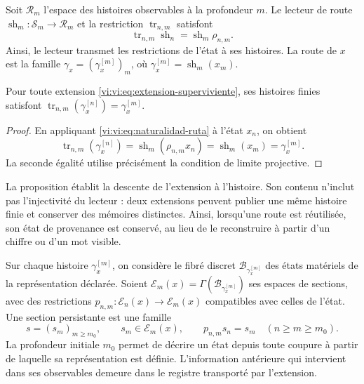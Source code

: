 Soit $\mathcal R_m$ l’espace des histoires observables à la profondeur $m$.
Le lecteur de route $\operatorname{sh}_m:\mathcal S_m\to\mathcal R_m$
et la restriction $\operatorname{tr}_{n,m}$ satisfont
\begin{equation}
 \operatorname{tr}_{n,m}\operatorname{sh}_n
 =\operatorname{sh}_m\rho_{n,m}.
 \label{vi:vi:eq:naturalidad-ruta}
\end{equation}
Ainsi, le lecteur transmet les restrictions de l’état à ses histoires.
La route de $x$ est la famille
$\gamma_x=(\gamma_x^{[m]})_m$, où
$\gamma_x^{[m]}=\operatorname{sh}_m(x_m)$.

\begin{proposition}
\label{vi:vi:prop:historia-compatible}
Pour toute extension \eqref{vi:vi:eq:extension-superviviente}, ses histoires
finies satisfont
$\operatorname{tr}_{n,m}(\gamma_x^{[n]})=\gamma_x^{[m]}$.
\end{proposition}
\begin{proof}
En appliquant \eqref{vi:vi:eq:naturalidad-ruta} à l’état $x_n$, on obtient
\[
 \operatorname{tr}_{n,m}(\gamma_x^{[n]})
 =\operatorname{sh}_m(\rho_{n,m}x_n)
 =\operatorname{sh}_m(x_m)=\gamma_x^{[m]}.
\]
La seconde égalité utilise précisément la condition de limite projective.
\end{proof}

La proposition établit la descente de l’extension à l’histoire.
Son contenu n’inclut pas l’injectivité du lecteur : deux extensions
peuvent publier une même histoire finie et conserver des mémoires distinctes.
Ainsi, lorsqu’une route est réutilisée, son état de provenance est conservé,
au lieu de le reconstruire à partir d’un chiffre ou d’un mot visible.

Sur chaque histoire $\gamma_x^{[m]}$, on considère le fibré discret
$\mathcal B_{\gamma_x^{[m]}}$ des états matériels de la représentation
déclarée. Soient
$\mathscr E_m(x)=\Gamma(\mathcal B_{\gamma_x^{[m]}})$ ses espaces
de sections, avec des restrictions
$p_{n,m}:\mathscr E_n(x)\to\mathscr E_m(x)$ compatibles avec celles
de l’état. Une section persistante est une famille
\begin{equation}
 s=(s_m)_{m\geq m_0},\qquad s_m\in\mathscr E_m(x),\qquad
 p_{n,m}s_n=s_m\quad(n\geq m\geq m_0).
 \label{vi:vi:eq:seccion-persistente}
\end{equation}
La profondeur initiale $m_0$ permet de décrire un état depuis toute
coupure à partir de laquelle sa représentation est définie. L’information
antérieure qui intervient dans ses observables demeure dans le registre
transporté par l’extension.

